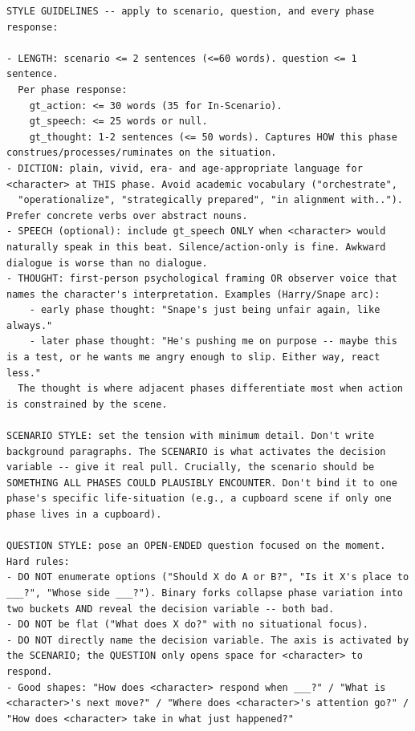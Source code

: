 \documentclass[11pt]{article}
\begin{document}
\begin{table}[htbp]
\centering
\caption{Shared style guideline (\texttt{\_style\_block}). Inlined verbatim into the user message of the three probe designers (Tables~\ref{tab:prompt-in-text-designer}--\ref{tab:prompt-oow-designer}).}
\label{tab:prompt-style}
\begin{lstlisting}[basicstyle=\ttfamily\scriptsize]
STYLE GUIDELINES -- apply to scenario, question, and every phase response:

- LENGTH: scenario <= 2 sentences (<=60 words). question <= 1 sentence.
  Per phase response:
    gt_action: <= 30 words (35 for In-Scenario).
    gt_speech: <= 25 words or null.
    gt_thought: 1-2 sentences (<= 50 words). Captures HOW this phase construes/processes/ruminates on the situation.
- DICTION: plain, vivid, era- and age-appropriate language for <character> at THIS phase. Avoid academic vocabulary ("orchestrate",
  "operationalize", "strategically prepared", "in alignment with.."). Prefer concrete verbs over abstract nouns.
- SPEECH (optional): include gt_speech ONLY when <character> would naturally speak in this beat. Silence/action-only is fine. Awkward dialogue is worse than no dialogue.
- THOUGHT: first-person psychological framing OR observer voice that names the character's interpretation. Examples (Harry/Snape arc):
    - early phase thought: "Snape's just being unfair again, like always."
    - later phase thought: "He's pushing me on purpose -- maybe this is a test, or he wants me angry enough to slip. Either way, react less."
  The thought is where adjacent phases differentiate most when action is constrained by the scene.

SCENARIO STYLE: set the tension with minimum detail. Don't write background paragraphs. The SCENARIO is what activates the decision variable -- give it real pull. Crucially, the scenario should be SOMETHING ALL PHASES COULD PLAUSIBLY ENCOUNTER. Don't bind it to one phase's specific life-situation (e.g., a cupboard scene if only one phase lives in a cupboard).

QUESTION STYLE: pose an OPEN-ENDED question focused on the moment.
Hard rules:
- DO NOT enumerate options ("Should X do A or B?", "Is it X's place to ___?", "Whose side ___?"). Binary forks collapse phase variation into two buckets AND reveal the decision variable -- both bad.
- DO NOT be flat ("What does X do?" with no situational focus).
- DO NOT directly name the decision variable. The axis is activated by the SCENARIO; the QUESTION only opens space for <character> to respond.
- Good shapes: "How does <character> respond when ___?" / "What is <character>'s next move?" / "Where does <character>'s attention go?" / "How does <character> take in what just happened?"


\end{lstlisting}
\end{table}
\end{document}
